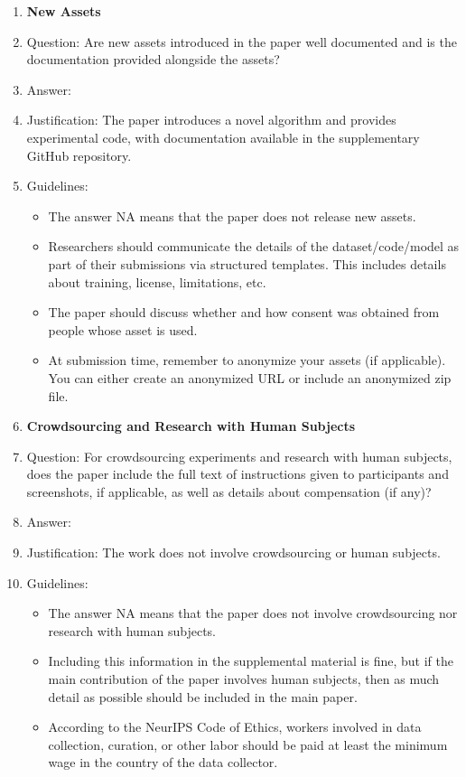 \documentclass{article}
\begin{document}
\begin{enumerate}
\item {\bf New Assets}
    \item[] Question: Are new assets introduced in the paper well documented and is the documentation provided alongside the assets?
    \item[] Answer: \answerYes{}
    \item[] Justification: The paper introduces a novel algorithm and provides experimental code, with documentation available in the supplementary GitHub repository.
    \item[] Guidelines:
    \begin{itemize}
        \item The answer NA means that the paper does not release new assets.
        \item Researchers should communicate the details of the dataset/code/model as part of their submissions via structured templates. This includes details about training, license, limitations, etc. 
        \item The paper should discuss whether and how consent was obtained from people whose asset is used.
        \item At submission time, remember to anonymize your assets (if applicable). You can either create an anonymized URL or include an anonymized zip file.
    \end{itemize}

\item {\bf Crowdsourcing and Research with Human Subjects}
    \item[] Question: For crowdsourcing experiments and research with human subjects, does the paper include the full text of instructions given to participants and screenshots, if applicable, as well as details about compensation (if any)? 
    \item[] Answer: \answerNA{}
    \item[] Justification: The work does not involve crowdsourcing or human subjects.
    \item[] Guidelines:
    \begin{itemize}
        \item The answer NA means that the paper does not involve crowdsourcing nor research with human subjects.
        \item Including this information in the supplemental material is fine, but if the main contribution of the paper involves human subjects, then as much detail as possible should be included in the main paper. 
        \item According to the NeurIPS Code of Ethics, workers involved in data collection, curation, or other labor should be paid at least the minimum wage in the country of the data collector. 
    \end{itemize}


\end{enumerate}
\end{document}

